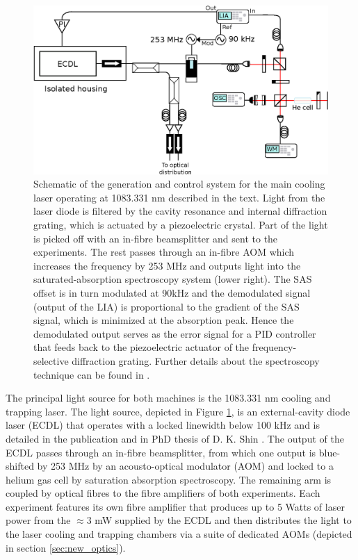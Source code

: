 	\begin{figure}
		\centering
		\includegraphics[width=\textwidth]{fig/apparatus/master_laser_system}
		\caption{Schematic of the generation and control system for the main cooling laser operating at 1083.331 nm described in the text. Light from the laser diode is filtered by the cavity resonance and internal diffraction grating, which is actuated by a piezoelectric crystal. Part of the light is picked off with an in-fibre beamsplitter and sent to the experiments. The rest passes through an in-fibre AOM which increases the frequency by 253 MHz and outputs light into the saturated-absorption spectroscopy system (lower right). The SAS offset is in turn modulated at 90kHz and the demodulated signal (output of the LIA) is proportional to the gradient of the SAS signal, which is minimized at the absorption peak. Hence the demodulated output serves as the error signal for a PID controller that feeds back to the piezoelectric actuator of the frequency-selective diffraction grating. Further details about the spectroscopy technique can be found in \cite{ShinThesis,FootAtomic}.}
		\label{fig:main_laser}
	\end{figure}
	
	
	The principal light source for both machines is the 1083.331 nm cooling and trapping laser.
	The light source, depicted in Figure \ref{fig:main_laser}, is an external-cavity diode laser (ECDL) that operates with a locked linewidth below 100 kHz and is detailed in the publication \cite{Shin16} and in PhD thesis of D. K. Shin \cite{ShinThesis}.
	The output of the ECDL passes through an in-fibre beamsplitter, from which one output is blue-shifted by 253 MHz by an acousto-optical modulator (AOM) and locked to a helium gas cell by saturation absorption spectroscopy.
	The remaining arm is coupled by optical fibres to the fibre amplifiers of both experiments.
	Each experiment features its own fibre amplifier that produces up to 5 Watts of laser power from the $\approx$3 mW supplied by the ECDL and then distributes the light to the laser cooling and trapping chambers via a suite of dedicated AOMs (depicted in section \ref{sec:new_optics}).

